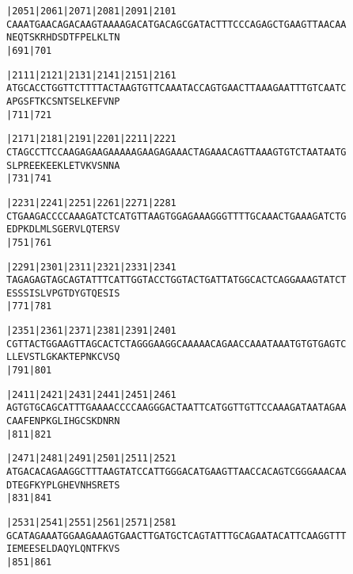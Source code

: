 \documentclass{article}
\begin{document}
\newpage
\begin{alltt}
|2051     |2061     |2071     |2081     |2091     |2101     
CAAATGAACAGACAAGTAAAAGACATGACAGCGATACTTTCCCAGAGCTGAAGTTAACAA
  N  E  Q  T  S  K  R  H  D  S  D  T  F  P  E  L  K  L  T  N
                    |691                          |701      

|2111     |2121     |2131     |2141     |2151     |2161     
ATGCACCTGGTTCTTTTACTAAGTGTTCAAATACCAGTGAACTTAAAGAATTTGTCAATC
  A  P  G  S  F  T  K  C  S  N  T  S  E  L  K  E  F  V  N  P
                    |711                          |721      

|2171     |2181     |2191     |2201     |2211     |2221     
CTAGCCTTCCAAGAGAAGAAAAAGAAGAGAAACTAGAAACAGTTAAAGTGTCTAATAATG
  S  L  P  R  E  E  K  E  E  K  L  E  T  V  K  V  S  N  N  A
                    |731                          |741      

|2231     |2241     |2251     |2261     |2271     |2281     
CTGAAGACCCCAAAGATCTCATGTTAAGTGGAGAAAGGGTTTTGCAAACTGAAAGATCTG
  E  D  P  K  D  L  M  L  S  G  E  R  V  L  Q  T  E  R  S  V
                    |751                          |761      

|2291     |2301     |2311     |2321     |2331     |2341     
TAGAGAGTAGCAGTATTTCATTGGTACCTGGTACTGATTATGGCACTCAGGAAAGTATCT
  E  S  S  S  I  S  L  V  P  G  T  D  Y  G  T  Q  E  S  I  S
                    |771                          |781      

|2351     |2361     |2371     |2381     |2391     |2401     
CGTTACTGGAAGTTAGCACTCTAGGGAAGGCAAAAACAGAACCAAATAAATGTGTGAGTC
  L  L  E  V  S  T  L  G  K  A  K  T  E  P  N  K  C  V  S  Q
                    |791                          |801      

|2411     |2421     |2431     |2441     |2451     |2461     
AGTGTGCAGCATTTGAAAACCCCAAGGGACTAATTCATGGTTGTTCCAAAGATAATAGAA
  C  A  A  F  E  N  P  K  G  L  I  H  G  C  S  K  D  N  R  N
                    |811                          |821      

|2471     |2481     |2491     |2501     |2511     |2521     
ATGACACAGAAGGCTTTAAGTATCCATTGGGACATGAAGTTAACCACAGTCGGGAAACAA
  D  T  E  G  F  K  Y  P  L  G  H  E  V  N  H  S  R  E  T  S
                    |831                          |841      

|2531     |2541     |2551     |2561     |2571     |2581     
GCATAGAAATGGAAGAAAGTGAACTTGATGCTCAGTATTTGCAGAATACATTCAAGGTTT
  I  E  M  E  E  S  E  L  D  A  Q  Y  L  Q  N  T  F  K  V  S
                    |851                          |861      

\end{alltt}
\end{document}
